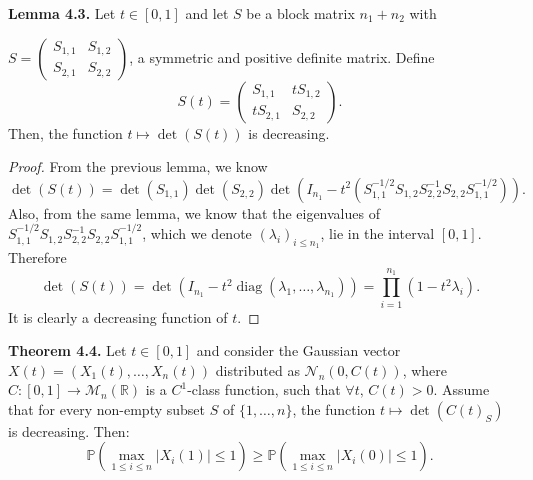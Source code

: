 \documentclass[12pt]{article}
\begin{document}
\textbf{Lemma 4.3.} Let $t \in [0,1]$ and let $S$ be a block matrix $n_1 + n_2$ with

$S = \begin{pmatrix} S_{1,1} & S_{1,2} \\ S_{2,1} & S_{2,2} \end{pmatrix}$, a symmetric and positive definite matrix. Define
\[
S(t) = \begin{pmatrix} S_{1,1} & t S_{1,2} \\ t S_{2,1} & S_{2,2} \end{pmatrix}.
\]
Then, the function $t \mapsto \det(S(t))$ is decreasing.

\begin{proof}
From the previous lemma, we know
\[
\det(S(t)) = \det(S_{1,1}) \det(S_{2,2}) \det\!\left(I_{n_1} - t^2 \left(S_{1,1}^{-1/2} S_{1,2} S_{2,2}^{-1} S_{2,2} S_{1,1}^{-1/2}\right)\right).
\]
Also, from the same lemma, we know that the eigenvalues of $S_{1,1}^{-1/2} S_{1,2} S_{2,2}^{-1} S_{2,2} S_{1,1}^{-1/2}$, which we denote $(\lambda_i)_{i \leq n_1}$, lie in the interval $[0,1]$. Therefore
\[
\det(S(t)) = \det\!\left(I_{n_1} - t^2 \operatorname{diag}(\lambda_1, \ldots, \lambda_{n_1})\right) = \prod_{i=1}^{n_1} (1 - t^2 \lambda_i).
\]
It is clearly a decreasing function of $t$.
\end{proof}

\textbf{Theorem 4.4.} Let $t \in [0, 1]$ and consider the Gaussian vector $X(t) = (X_1(t), \dots, X_n(t))$ distributed as $\mathcal{N}_n(0, C(t))$, where $C : [0, 1] \to \mathcal{M}_n(\mathbb{R})$ is a $C^1$-class function, such that $\forall t,\, C(t) > 0$. Assume that for every non-empty subset $S$ of $\{1, \dots, n\}$, the function $t \mapsto \det(C(t)_S)$ is decreasing. Then:
\[
\mathbb{P}\left( \max_{1 \leq i \leq n} |X_i(1)| \leq 1 \right) \geq \mathbb{P}\left( \max_{1 \leq i \leq n} |X_i(0)| \leq 1 \right).
\]
\end{document}
